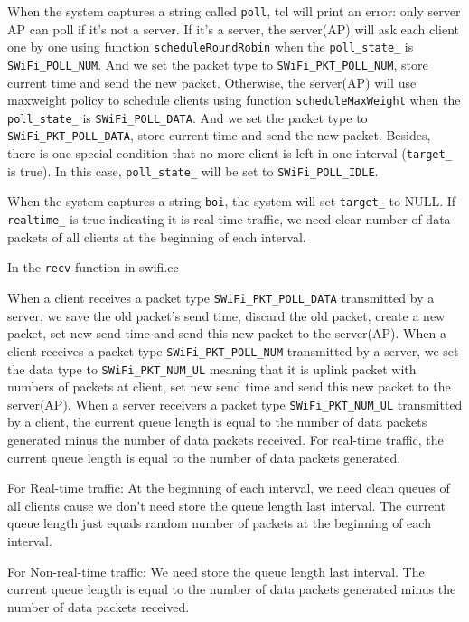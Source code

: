 \documentclass{article}
\begin{document}
When the system captures a string called  \lstinline |poll|, tcl will print an error: only server AP can poll if it's not a server. If it's a server, the server(AP) will ask each client one by one using function \lstinline |scheduleRoundRobin| when the \lstinline |poll_state_| is  \lstinline |SWiFi_POLL_NUM|. And we set the packet type to \lstinline |SWiFi_PKT_POLL_NUM|, store current time and send the new packet. Otherwise, the server(AP) will use maxweight policy to schedule clients using function \lstinline |scheduleMaxWeight| when the \lstinline |poll_state_| is  \lstinline |SWiFi_POLL_DATA|. And we set the packet type to \lstinline |SWiFi_PKT_POLL_DATA|, store current time and send the new packet. Besides, there is one special condition that no more client is left in one interval (\lstinline |target_| is true). In this case, \lstinline |poll_state_| will be set to \lstinline |SWiFi_POLL_IDLE|.


When the system captures a string \lstinline |boi|, the system will set \lstinline |target_| to NULL. If  \lstinline |realtime_|  is true indicating it is real-time traffic, we need clear number of data packets of all clients at the beginning of each interval. 

In the  \lstinline |recv| function in swifi.cc

When a client receives a packet type \lstinline |SWiFi_PKT_POLL_DATA| transmitted by a server, we save the old packet's send time, discard the old packet, create a new packet, set new send time and send this new packet to the server(AP). 
When a client receives a packet type \lstinline |SWiFi_PKT_POLL_NUM| transmitted by a server, we set the data type to \lstinline |SWiFi_PKT_NUM_UL| meaning that it is uplink packet with numbers of packets at client, set new send time and send this new packet to the server(AP).
When a server receivers  a packet type \lstinline |SWiFi_PKT_NUM_UL| transmitted by a client, the current queue length is equal to the number of data packets generated minus the number of data packets received. For real-time traffic, the current queue length is equal to the number of data packets generated.  

For Real-time traffic: At the beginning of each interval, we need clean queues of all clients cause we don't need store the queue length last interval. The current queue length just equals random number of packets at the beginning of each interval. 

For Non-real-time traffic: We need store the queue length last interval. The current queue length is equal to the number of data packets generated minus the number of data packets received. 
\end{document}
